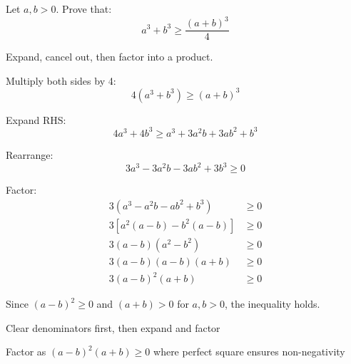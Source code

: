 \begin{problem}
Let $a, b > 0$. Prove that:
\[
a^3 + b^3 \geq \frac{(a + b)^3}{4}
\]
\end{problem}

\begin{hint}
Expand, cancel out, then factor into a product.
\end{hint}

\begin{solution}
Multiply both sides by 4:
\[ 4(a^3 + b^3) \geq (a + b)^3 \]

Expand RHS:
\[ 4a^3 + 4b^3 \geq a^3 + 3a^2b + 3ab^2 + b^3 \]

Rearrange:
\[ 3a^3 - 3a^2b - 3ab^2 + 3b^3 \geq 0 \]

Factor:
\begin{align*}
3(a^3 - a^2b - ab^2 + b^3) &\geq 0 \\
3[a^2(a - b) - b^2(a - b)] &\geq 0 \\
3(a - b)(a^2 - b^2) &\geq 0 \\
3(a - b)(a - b)(a + b) &\geq 0 \\
3(a - b)^2(a + b) &\geq 0
\end{align*}

Since $(a - b)^2 \geq 0$ and $(a + b) > 0$ for $a, b > 0$, the inequality holds.
\end{solution}

\begin{takeaways}
\item Clear denominators first, then expand and factor
\item Factor as $(a-b)^2(a+b) \geq 0$ where perfect square ensures non-negativity
\end{takeaways}
